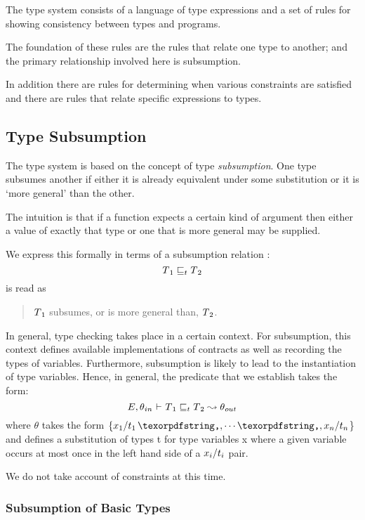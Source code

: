 The type system consists of a language of type expressions and a set of rules for showing consistency between types and programs. 

The foundation of these rules are the rules that relate one type to another; and the primary relationship involved here is subsumption.

In addition there are rules for determining when various constraints are satisfied and there are rules that relate specific expressions to types.

\subsection{Type Subsumption}
\label{typeSubsumption}

The type system is based on the concept of type \emph{subsumption}. One type subsumes another if either it is already equivalent under some substitution or it is `more general' than the other.
\begin{aside}
The intuition is that if a function expects a certain kind of argument then either a value of exactly that type or one that is more general may be supplied.
\end{aside}

We express this formally in terms of a subsumption relation \subsume:
\[
T\sub1\subsume{}T\sub2
\]
is read as
\begin{quote}
$T\sub1$ subsumes, or is more general than, $T\sub2$.
\end{quote}
In general, type checking takes place in a certain context. For subsumption, this context defines available implementations of contracts as well as recording the types of variables. Furthermore, subsumption is likely to lead to the instantiation of type variables. Hence, in general, the predicate that we establish takes the form:
\[\entail{E,\theta\sub{in}}{T\sub1\subsume{}T\sub2}\leadsto\theta\sub{out}\]
where \ensuremath{\theta} 
takes the form \ensuremath{\{x\sub1/t\sub1\sequence{,}x\subn/t\subn}\} 
and defines a substitution of types t\subi{} for type variables x\subi{} where a given variable occurs at most once in the left hand side of a $x\subi/t\subi$ pair.

\begin{aside}
We do not take account of constraints at this time.
\end{aside}

\subsubsection{Subsumption of Basic Types}

